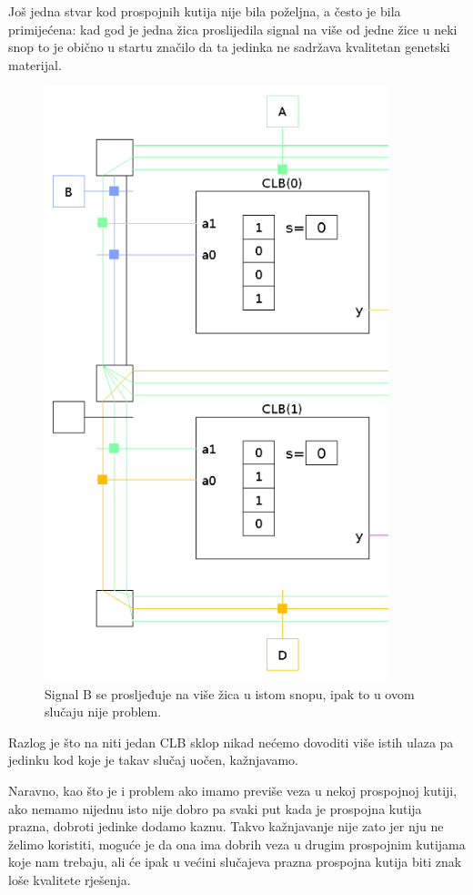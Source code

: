 \documentclass[times, utf8, zavrsni]{fer}
\begin{document}
	
	Još jedna stvar kod prospojnih kutija nije bila poželjna, a često je bila primijećena: kad god je jedna žica proslijedila signal na više od jedne žice u neki snop to je obično u startu značilo da ta jedinka ne sadržava kvalitetan genetski materijal.
	
	
	
	\begin{figure}[H]
		\centering
		\includegraphics[width=10cm]{slike/isjecakSusjedneVeze.png}
		\caption{Signal B se prosljeđuje na više žica u istom snopu, ipak to u ovom slučaju nije problem. }
		\label{fig:susjedne-veze}
	\end{figure} 
	
	
	Razlog je što na niti jedan CLB sklop nikad nećemo dovoditi više istih ulaza pa jedinku kod koje je takav slučaj uočen, kažnjavamo. 
	
	Naravno, kao što je i problem ako imamo previše veza u nekoj prospojnoj kutiji, ako nemamo nijednu isto nije dobro pa svaki put kada je prospojna kutija prazna, dobroti jedinke dodamo kaznu. Takvo kažnjavanje nije zato jer nju ne želimo koristiti, moguće je da ona ima dobrih veza u drugim prospojnim kutijama koje nam trebaju, ali će ipak u većini slučajeva prazna prospojna kutija biti znak loše kvalitete rješenja. 
	
\end{document}
